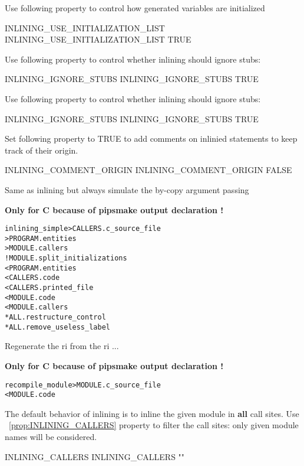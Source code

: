 \documentclass[a4paper]{report}
\newenvironment{PipsMake}{\begin{alltt}}{\end{alltt}}
\newcommand{\PipsPropRef}[1]{\texttt{\detokenize{#1}}~\ref{prop:#1}}
\newenvironment{PipsPass}[1]{\label{pass:#1}}{}
\begin{document}
Use following property to control how generated variables are initialized
\begin{PipsProp}{INLINING_USE_INITIALIZATION_LIST}
INLINING_USE_INITIALIZATION_LIST TRUE
\end{PipsProp}

Use following property to control whether inlining should ignore stubs:
\begin{PipsProp}{INLINING_IGNORE_STUBS}
INLINING_IGNORE_STUBS TRUE
\end{PipsProp}

Use following property to control whether inlining should ignore stubs:
\begin{PipsProp}{INLINING_IGNORE_STUBS}
INLINING_IGNORE_STUBS TRUE
\end{PipsProp}

Set following property to TRUE to add comments on inlinied statements to
keep track of their origin.
\begin{PipsProp}{INLINING_COMMENT_ORIGIN}
INLINING_COMMENT_ORIGIN FALSE
\end{PipsProp}

\begin{PipsPass}{inlining_simple}
Same as inlining but always simulate the by-copy argument passing
\end{PipsPass}

\textbf{Only for C because of pipsmake output declaration !}
\begin{PipsMake}
inlining_simple      > CALLERS.c_source_file
                     > PROGRAM.entities
                     > MODULE.callers
		! MODULE.split_initializations
        < PROGRAM.entities
        < CALLERS.code
        < CALLERS.printed_file
		< MODULE.code
        < MODULE.callers
        * ALL.restructure_control
		* ALL.remove_useless_label
\end{PipsMake}

\begin{PipsPass}{recompile_module}
Regenerate the ri from the ri ...
\end{PipsPass}

\textbf{Only for C because of pipsmake output declaration !}
\begin{PipsMake}
recompile_module > MODULE.c_source_file
	< MODULE.code
\end{PipsMake}


The default behavior of inlining is to inline the given module in \textbf{all} call sites.
Use \PipsPropRef{INLINING_CALLERS} property to filter the call sites: only given module names will be considered.
\begin{PipsProp}{INLINING_CALLERS}
INLINING_CALLERS ""
\end{PipsProp}
\end{document}
